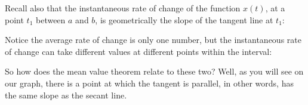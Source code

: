 \documentclass[pdftex, brazil, 12pt, twoside]{article}
\begin{document}
Recall also that the instantaneous rate
of change of the function $x(t)$,
at a point $t_1$ between $a$ and $b$, is geometrically
the slope of the tangent line at $t_1$:

\begin{figure}[H]
  \begin{center}
    \label{fig:mvt-avgxinst-7}
  \end{center}
\end{figure}

Notice the average rate of change is only one number,
but the instantaneous rate of change
can take different values at different points
within the interval:

\begin{figure}[H]
  \begin{center}
    \label{fig:mvt-avgxinst-8}
  \end{center}
\end{figure}

So how does the mean value theorem relate to these two?
Well, as you will see on our graph,
there is a point at which the tangent
is parallel, in other words, has the same slope
as the secant line.
\end{document}
